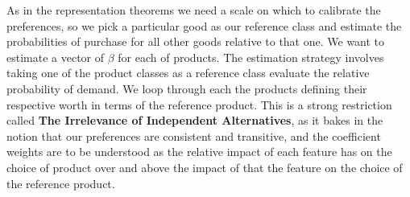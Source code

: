 \documentclass[
]{book}
\theoremstyle{definition}
\theoremstyle{definition}
\theoremstyle{definition}
\theoremstyle{remark}
\begin{document}
As in the representation theorems we need a scale on which to calibrate the preferences, so we pick a particular good as our reference class and estimate the probabilities of purchase for all other goods relative to that one. We want to estimate a vector of \(\beta\) for each of products. The estimation strategy involves taking one of the product classes as a reference class evaluate the relative probability of demand. We loop through each the products defining their respective worth in terms of the reference product. This is a strong restriction called \textbf{The Irrelevance of Independent Alternatives}, as it bakes in the notion that our preferences are consistent and transitive, and the coefficient weights are to be understood as the relative impact of each feature has on the choice of product over and above the impact of that the feature on the choice of the reference product.
\end{document}
